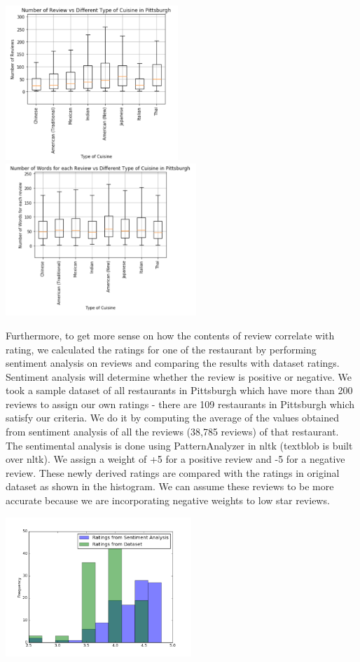 \documentclass{neu_handout}
\begin{document}
\begin{center}
	\includegraphics[width=65mm,scale=0.3]{number_of_review_vs_cuisine.png}
	\includegraphics[width=72mm,scale=0.3]{average_review_length.png}
\end{center}





Furthermore, to get more sense on how the contents of review correlate with rating, we calculated the ratings for one of the restaurant by performing sentiment analysis on reviews and comparing the results with dataset ratings. Sentiment analysis will determine whether the review is positive or negative. We took a sample dataset of all restaurants in Pittsburgh which have more than 200 reviews to assign our own ratings - there are 109 restaurants in Pittsburgh which satisfy our criteria. We do it by computing the average of the values obtained from sentiment analysis of all the reviews (38,785 reviews) of that restaurant. The sentimental analysis is done using PatternAnalyzer in nltk (textblob is built over nltk). We assign a weight of +5 for a positive review and -5 for a negative review. These newly derived ratings are compared with the ratings in original dataset as shown in the histogram. We can assume these reviews to be more accurate because we are incorporating negative weights to low star reviews.

\begin{center}
\includegraphics[width=70mm,scale=0.5]{sentimentanalysis}
\end{center}
\end{document}
